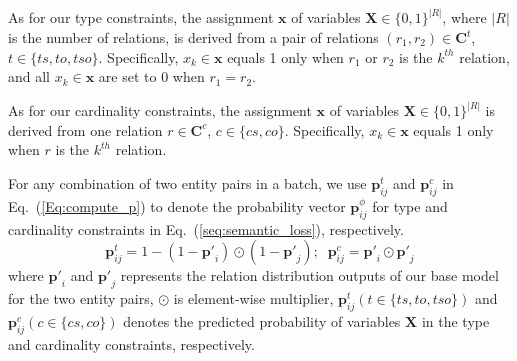 
As for our type constraints, the assignment $\bm x$ of variables $\bm{X}\in \{0,1\}^{|R|}$, where $|R|$ is the number of relations, 
is derived from a pair of relations $(r_1, r_2) \in \bm{C}^{t}$, $t\in\{ts,to,tso\}$.
Specifically, $x_k\in \bm{x}$ equals 1 only when $r_1$ or $r_2$ is the $k^{th}$ relation,
and all $x_k\in \bm{x}$ are set to 0 when $r_1=r_2$.

As for our cardinality constraints, the assignment $\bm x$ of variables $\bm{X}\in \{0,1\}^{|R|}$ is derived from one relation $r \in \bm{C}^{c}$, $c\in\{cs,co\}$. 
Specifically, $x_k\in \bm{x}$ equals 1 only when $r$ is the $k^{th}$ relation.

For any combination of two entity pairs in a batch, we use $\bm{p}_{ij}^{t}$ and $\bm{p}_{ij}^{c}$ in Eq.~(\ref{Eq:compute_p}) to denote the probability vector $\bm{p}^{\phi}_{ij}$ for type and cardinality constraints in Eq.~(\ref{seq:semantic_loss}), respectively.
\begin{equation}
\label{Eq:compute_p}
\bm{p}_{ij}^{t} = 1-(1-\bm{p'}_{i}) \odot (1-\bm{p'}_{j});\;\; \bm{p}_{ij}^{c} = \bm{p'}_{i} \odot \bm{p'}_{j}
\end{equation}
where $\bm{p'}_i$ and $\bm{p'}_j$ represents the relation distribution outputs of our base model for the two entity pairs,
$\odot$ is element-wise multiplier,
$\bm{p}_{ij}^{t}(t \in \{ts, to, tso\})$ and $\bm{p}_{ij}^{c}(c \in \{cs, co\})$ denotes the predicted probability of variables $\bm{X}$ in the type and cardinality constraints, respectively.

